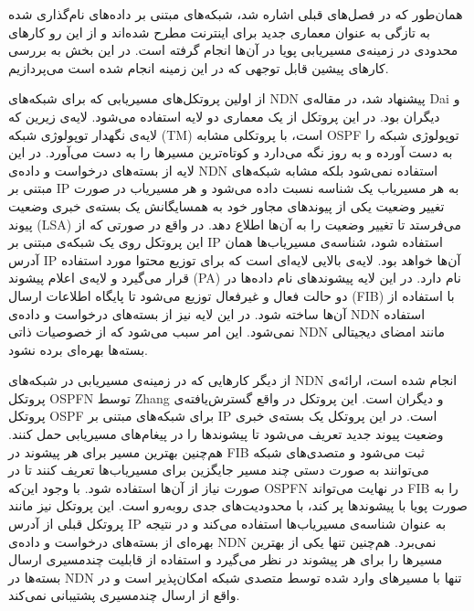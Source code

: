
\label{prevWorks}

همان‌طور که در فصل‌های قبلی اشاره شد، شبکه‌های مبتنی بر داده‌‌های نام‌گذاری شده به تازگی به عنوان معماری جدید برای اینترنت مطرح شده‌اند و از این رو کارهای محدودی در زمینه‌ی مسیریابی پویا در آن‌ها انجام گرفته است. در این بخش به بررسی کارهای پیشین قابل توجهی که در این زمینه انجام شده است می‌پردازیم.

از اولین پروتکل‌های مسیریابی که برای شبکه‌های NDN پیشنهاد شد، در مقاله‌ی Dai و دیگران \cite{two-layer} بود. در این پروتکل از یک معماری دو لایه استفاده می‌شود. لایه‌ی زیرین که لایه‌ی نگهدار توپولوژی شبکه  (TM) است، با پروتکلی مشابه OSPF توپولوژی شبکه را به دست آورده و به روز نگه می‌دارد و کوتاه‌ترین مسیرها را به دست می‌آورد. در این لایه از بسته‌های درخواست و داده‌ی NDN استفاده نمی‌شود بلکه مشابه شبکه‌های مبتنی بر IP به هر مسیریاب یک شناسه نسبت داده می‌شود و هر مسیریاب در صورت تغییر وضعیت یکی از پیوند‌‌های مجاور خود به همسایگانش یک بسته‌ی خبری وضعیت پیوند  (LSA) می‌فرستد تا تغییر وضعیت را به آن‌ها اطلاع دهد. در واقع در صورتی که از این پروتکل روی یک شبکه‌ی مبتنی بر IP استفاده شود، شناسه‌ی مسیریاب‌ها همان آدرس IP آن‌ها خواهد بود. لایه‌ی بالایی لایه‌ای است که برای توزیع محتوا مورد استفاده قرار می‌گیرد و لایه‌ی اعلام پیشوند   (PA) نام دارد. در این لایه پیشوند‌های نام داده‌ها در دو حالت فعال و غیرفعال توزیع می‌شود تا پایگاه اطلاعات ارسال (FIB) با استفاده از آن‌ها ساخته شود. در این لایه نیز از بسته‌های درخواست و داده‌ی NDN استفاده نمی‌شود. این امر سبب می‌شود که از خصوصیات ذاتی NDN مانند امضای دیجیتالی بسته‌ها بهره‌ای برده نشود.

از دیگر کارهایی که در زمینه‌ی مسیریابی در شبکه‌های NDN انجام شده است، ارائه‌ی پروتکل OSPFN توسط Zhang و دیگران \cite{ospfn} است. این پروتکل در واقع گسترش‌یافته‌ی پروتکل OSPF برای شبکه‌های مبتنی بر IP است. در این پروتکل یک بسته‌ی خبری وضعیت پیوند جدید تعریف می‌شود تا پیشوند‌ها را در پیغام‌های مسیریابی حمل کنند. هم‌چنین بهترین مسیر برای هر پیشوند در FIB ثبت می‌شود و متصدی‌های شبکه می‌توانند به صورت دستی چند مسیر جایگزین برای مسیریاب‌ها تعریف کنند تا در صورت نیاز از آن‌ها استفاده شود. با وجود این‌که OSPFN در نهایت می‌تواند FIB را به صورت پویا با پیشوندها پر کند، با محدودیت‌های جدی روبه‌رو است. این پروتکل نیز مانند پروتکل قبلی از آدرس IP به عنوان شناسه‌ی مسیریاب‌ها استفاده می‌کند و در نتیجه بهره‌ای از بسته‌های درخواست و داده‌ی NDN نمی‌برد. هم‌چنین تنها یکی از بهترین مسیرها را برای هر پیشوند در نظر می‌گیرد و استفاده از قابلیت چندمسیری ارسال بسته‌ها در NDN تنها با مسیرهای وارد شده توسط متصدی شبکه امکان‌پذیر است و در واقع از ارسال چندمسیری پشتیبانی نمی‌کند.

